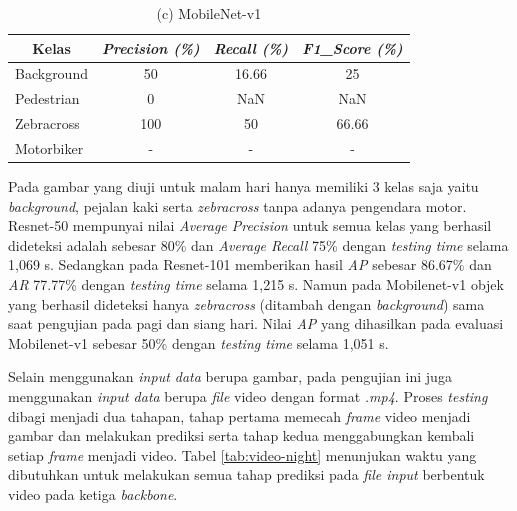 \begin{table}[H]
\begin{minipage}[b]{\textwidth}
	\end{minipage}
	\vfill
	\begin{minipage}[b]{\textwidth}
		\centering
		\caption*{(c) MobileNet-v1}
		\begin{tabular}{|l|c|c|c|}
			\hline
			\multicolumn{1}{|c|}{\textbf{Kelas}} & \textit{\textbf{Precision (\%)}} & \textit{\textbf{Recall (\%)}} & \textit{\textbf{F1\_Score (\%)}} \\ \hline
			Background                           & 50                               & 16.66                         & 25                               \\ \hline
			Pedestrian                           & 0                                & NaN                           & NaN                              \\ \hline
			Zebracross                           & 100                              & 50                            & 66.66                            \\ \hline
			Motorbiker                           & -                                & -                             & -                                \\ \hline
		\end{tabular}
		
	\end{minipage}
	
	\label{tab:evaluate-night}
\end{table}

Pada gambar yang diuji untuk malam hari hanya memiliki 3 kelas saja yaitu \textit{background}, pejalan kaki serta \textit{zebracross} tanpa adanya pengendara motor. Resnet-50 mempunyai nilai \textit{Average Precision} untuk semua kelas yang berhasil dideteksi adalah sebesar 80\% dan \textit{Average Recall} 75\% dengan \textit{testing time} selama 1,069 s. Sedangkan pada Resnet-101 memberikan hasil \textit{AP} sebesar 86.67\% dan \textit{AR} 77.77\% dengan \textit{testing time} selama 1,215 s. Namun pada Mobilenet-v1 objek yang berhasil dideteksi hanya \textit{zebracross} (ditambah dengan \textit{background}) sama saat pengujian pada pagi dan siang hari. Nilai \textit{AP} yang dihasilkan pada evaluasi Mobilenet-v1 sebesar 50\% dengan \textit{testing time} selama 1,051 s.

Selain menggunakan \textit{input data} berupa gambar, pada pengujian ini juga menggunakan \textit{input data} berupa \textit{file} video dengan format \textit{.mp4}. Proses \textit{testing} dibagi menjadi dua tahapan, tahap pertama memecah \textit{frame} video menjadi gambar dan melakukan prediksi serta tahap kedua menggabungkan kembali setiap \textit{frame} menjadi video. Tabel \ref{tab:video-night} menunjukan waktu yang dibutuhkan untuk melakukan semua tahap prediksi pada \textit{file input} berbentuk video pada ketiga \textit{backbone}.

